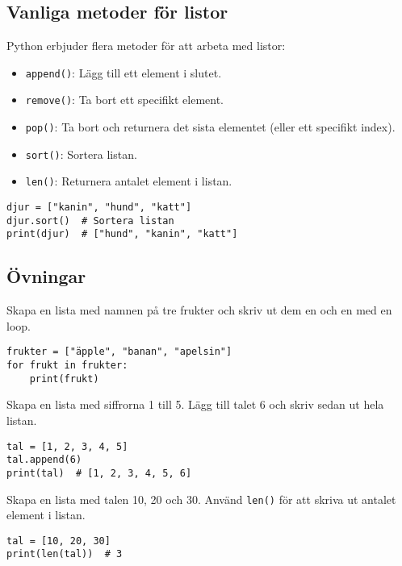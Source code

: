 
\subsection{Vanliga metoder för listor}
Python erbjuder flera metoder för att arbeta med listor:
\begin{itemize}
    \item \texttt{append()}: Lägg till ett element i slutet.
    \item \texttt{remove()}: Ta bort ett specifikt element.
    \item \texttt{pop()}: Ta bort och returnera det sista elementet (eller ett specifikt index).
    \item \texttt{sort()}: Sortera listan.
    \item \texttt{len()}: Returnera antalet element i listan.
\end{itemize}
\begin{lstlisting}[title=Exempel: Använda lista-metoder]
djur = ["kanin", "hund", "katt"]
djur.sort()  # Sortera listan
print(djur)  # ["hund", "kanin", "katt"]
\end{lstlisting}

\subsection{Övningar}
\begin{exercise}
Skapa en lista med namnen på tre frukter och skriv ut dem en och en med en loop.
\end{exercise}
\begin{solution}
\begin{lstlisting}
frukter = ["äpple", "banan", "apelsin"]
for frukt in frukter:
    print(frukt)
\end{lstlisting}
\end{solution}

\begin{exercise}
Skapa en lista med siffrorna 1 till 5. Lägg till talet 6 och skriv sedan ut hela listan.
\end{exercise}
\begin{solution}
\begin{lstlisting}
tal = [1, 2, 3, 4, 5]
tal.append(6)
print(tal)  # [1, 2, 3, 4, 5, 6]
\end{lstlisting}
\end{solution}

\begin{exercise}
Skapa en lista med talen 10, 20 och 30. Använd \texttt{len()} för att skriva ut antalet element i listan.
\end{exercise}
\begin{solution}
\begin{lstlisting}
tal = [10, 20, 30]
print(len(tal))  # 3
\end{lstlisting}
\end{solution}

